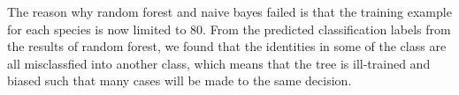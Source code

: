 \documentclass{article} %
\begin{document}
The reason why random forest and naive bayes failed is that the training example for each species is now limited to 80. From the predicted classification labels from the results of random forest, we found that the identities in some of the class are all misclassfied into another class, which means that the tree is ill-trained and biased such that many cases will be made to the same decision. 





\end{document}
